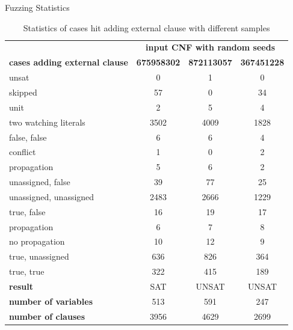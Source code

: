 \documentclass{beamer}
\begin{document}
\begin{frame}{Fuzzing Statistics}
  \scriptsize
  \begin{table}
    \centering
    \begin{tabular}{|l|c|c|c|}
      \hline
      & \multicolumn{3}{c|}{\textbf{input CNF with random seeds}} \\
      \cline{2-4}
      \textbf{cases adding external clause} & \textbf{675958302} & \textbf{872113057} & \textbf{367451228} \\
      \hline
      unsat & 0 & 1 & 0 \\
      skipped & 57 & 0 & 34 \\
      unit & 2 & 5 & 4 \\
      two watching literals & 3502 & 4009 & 1828 \\
      \quad false, false & 6 & 6 & 4 \\
      \quad\quad conflict & 1 & 0 & 2 \\
      \quad\quad propagation & 5 & 6 & 2 \\
      \quad unassigned, false & 39 & 77 & 25 \\
      \quad unassigned, unassigned & 2483 & 2666 & 1229 \\
      \quad true, false & 16 & 19 & 17 \\
      \quad\quad propagation & 6 & 7 & 8 \\
      \quad\quad no propagation & 10 & 12 & 9 \\
      \quad true, unassigned & 636 & 826 & 364 \\
      \quad true, true & 322 & 415 & 189 \\
      \hline
      \textbf{result} & SAT & UNSAT & UNSAT \\
      \textbf{number of variables} & 513 & 591 & 247 \\
      \textbf{number of clauses} & 3956 & 4629 & 2699 \\
      \hline
    \end{tabular}
    \caption{Statistics of cases hit adding external clause with different samples}
  \end{table}
\end{frame}
\end{document}
